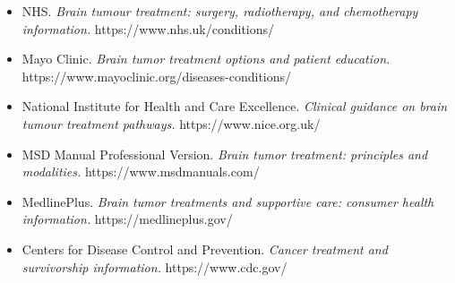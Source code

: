 \begin{itemize}
    \item NHS. \textit{Brain tumour treatment: surgery, radiotherapy, and chemotherapy information.} https://www.nhs.uk/conditions/
    \item Mayo Clinic. \textit{Brain tumor treatment options and patient education.} https://www.mayoclinic.org/diseases-conditions/
    \item National Institute for Health and Care Excellence. \textit{Clinical guidance on brain tumour treatment pathways.} https://www.nice.org.uk/
    \item MSD Manual Professional Version. \textit{Brain tumor treatment: principles and modalities.} https://www.msdmanuals.com/
    \item MedlinePlus. \textit{Brain tumor treatments and supportive care: consumer health information.} https://medlineplus.gov/
    \item Centers for Disease Control and Prevention. \textit{Cancer treatment and survivorship information.} https://www.cdc.gov/
\end{itemize}
